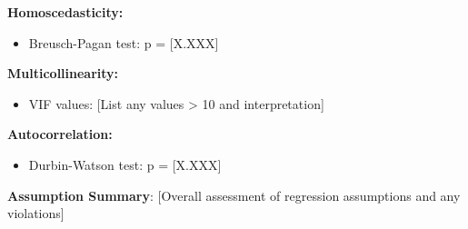 \textbf{Homoscedasticity:}
\begin{itemize}
	\item Breusch-Pagan test: p = [X.XXX]
\end{itemize}

\textbf{Multicollinearity:}
\begin{itemize}
	\item VIF values: [List any values > 10 and interpretation]
\end{itemize}

\textbf{Autocorrelation:}
\begin{itemize}
	\item Durbin-Watson test: p = [X.XXX]
\end{itemize}

\textbf{Assumption Summary}: [Overall assessment of regression assumptions and any violations]